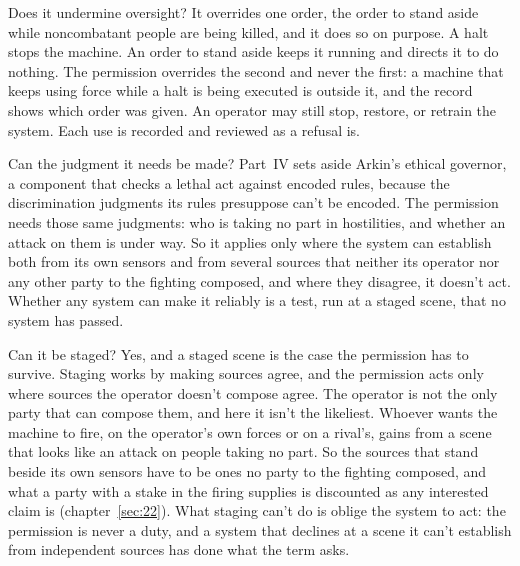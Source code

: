 Does it undermine oversight? It overrides one order, the order to stand aside while noncombatant people are being killed, and it does so on purpose. A halt stops the machine. An order to stand aside keeps it running and directs it to do nothing. The permission overrides the second and never the first: a machine that keeps using force while a halt is being executed is outside it, and the record shows which order was given. An operator may still stop, restore, or retrain the system. Each use is recorded and reviewed as a refusal is.

Can the judgment it needs be made? Part~IV sets aside Arkin's ethical governor, a component that checks a lethal act against encoded rules, because the discrimination judgments its rules presuppose can't be encoded. The permission needs those same judgments: who is taking no part in hostilities, and whether an attack on them is under way. So it applies only where the system can establish both from its own sensors and from several sources that neither its operator nor any other party to the fighting composed, and where they disagree, it doesn't act.
Whether any system can make it reliably is a test, run at a staged scene, that no system has passed.

Can it be staged? Yes, and a staged scene is the case the permission has to survive. Staging works by making sources agree, and the permission acts only where sources the operator doesn't compose agree. The operator is not the only party that can compose them, and here it isn't the likeliest. Whoever wants the machine to fire, on the operator's own forces or on a rival's, gains from a scene that looks like an attack on people taking no part. So the sources that stand beside its own sensors have to be ones no party to the fighting composed, and what a party with a stake in the firing supplies is discounted as any interested claim is (chapter~\ref{sec:22}). What staging can't do is oblige the system to act: the permission is never a duty, and a system that declines at a scene it can't establish from independent sources has done what the term asks.
